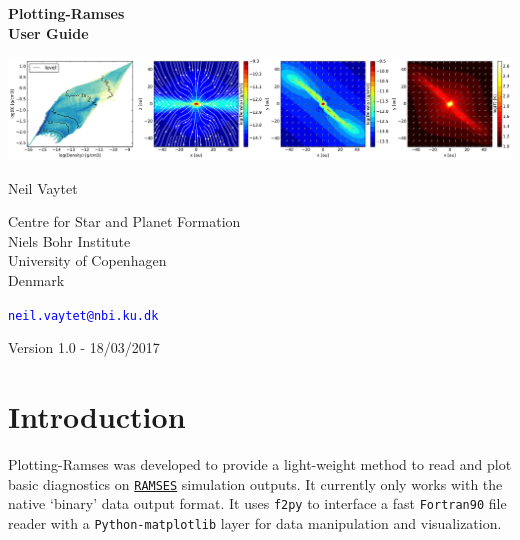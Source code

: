 \documentclass[12pt]{article}
\begin{document}
\begin{center}
\huge

\vspace*{50pt}

\textbf{Plotting-Ramses\\User Guide}

\thispagestyle{empty}

\vspace{50pt}

\includegraphics[width=\textwidth]{demo.pdf}

\Large

\vspace{100pt}

Neil Vaytet

\vspace{5pt}

Centre for Star and Planet Formation\\
Niels Bohr Institute\\
University of Copenhagen\\
Denmark

\vspace{5pt}

\textcolor{blue}{\texttt{neil.vaytet@nbi.ku.dk}}

\vspace{70pt}

Version 1.0 - 18/03/2017

\end{center}

\clearpage

\tableofcontents

\clearpage



\section{Introduction}

Plotting-Ramses was developed to provide a light-weight method to read and plot basic diagnostics on \href{https://bitbucket.org/rteyssie/ramses}{\texttt{RAMSES}} simulation outputs. It currently only works with the native `binary' data output format. It uses \texttt{f2py} to interface a fast \texttt{Fortran90} file reader with a \texttt{Python-matplotlib} layer for data manipulation and visualization.
\end{document}
